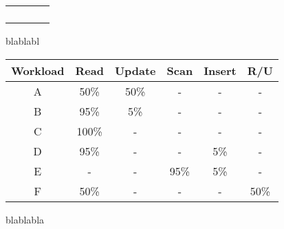 {
\begin{table*}[th]\footnotesize
\begin{minipage}{\figWidth}
\begin{center}
\begin{center}
\begin{tabular}{ c | c | c | c  }
\small  & \small  & \small  & \small  \\
\hline
 &  &  &  \\
 &  &  &  \\
 &  &  &  \\
 &  &  &  \\
\end{tabular}
\end{center}
{
blablabl
}
\end{center}
\end{minipage}
\begin{minipage}{\figSep}
\hspace{\figSep}
\end{minipage}
\begin{minipage}{\figWidth}
\begin{center}
\begin{center}
\begin{tabular}{ c | c | c | c | c | c }
\small Workload & \small Read & \small Update & \small Scan & \small Insert & \small R/U \\
\hline
A & 50\% & 50\% & - & - & - \\
B & 95\% & 5\% & - & - & - \\
C & 100\% & - & - & - & - \\
D & 95\% & - & - & 5\% & - \\
E & - & - & 95\% & 5\% & - \\
F & 50\% & - & - & - & 50\% \\
\end{tabular}
\end{center}
{
blablabla
}
\end{center}
\end{minipage}
\end{table*}
}

